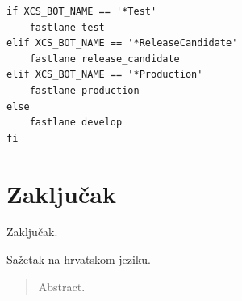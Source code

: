 \documentclass[times, utf8, diplomski, numeric]{fer}
\begin{document}
\begin{verbatim}
if XCS_BOT_NAME == '*Test'
    fastlane test
elif XCS_BOT_NAME == '*ReleaseCandidate'
    fastlane release_candidate
elif XCS_BOT_NAME == '*Production'
    fastlane production
else
    fastlane develop
fi
\end{verbatim}


\chapter{Zaključak}
Zaključak.




\begin{sazetak}
Sažetak na hrvatskom jeziku.

\end{sazetak}

\begin{abstract}
Abstract.

\end{abstract}
\end{document}
